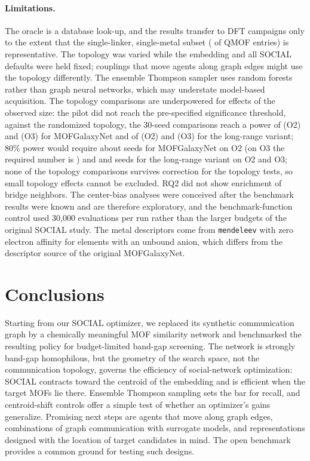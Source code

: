\documentclass[journal=jcisd8,manuscript=article]{achemso}
\begin{document}
\paragraph{Limitations.}
The oracle is a database look-up, and the results transfer to DFT campaigns only to the extent that the single-linker, single-metal subset (\nPool{} of \nQmofAll{} QMOF entries) is representative. The topology was varied while the embedding and all SOCIAL defaults were held fixed; couplings that move agents along graph edges might use the topology differently. The ensemble Thompson sampler uses random forests rather than graph neural networks, which may understate model-based acquisition. The topology comparisons are underpowered for effects of the observed size: the pilot did not reach the pre-specified significance threshold, against the randomized topology, the 30-seed comparisons reach a power of \topPowTwo{} (O2) and \topPowThree{} (O3) for MOFGalaxyNet and of \topRhoPowTwo{} (O2) and \topRhoPowThree{} (O3) for the long-range variant; 80\% power would require about \topNeightyTwo{} seeds for MOFGalaxyNet on O2 (on O3 the required number is \topNeightyThree{}) and \topRhoNeightyTwo{} and \topRhoNeightyThree{} seeds for the long-range variant on O2 and O3; none of the topology comparisons survives correction for the \nTopTests{} topology tests, so small topology effects cannot be excluded. RQ2 did not show enrichment of bridge neighbors. The center-bias analyses were conceived after the benchmark results were known and are therefore exploratory, and the benchmark-function control used 30,000 evaluations per run rather than the larger budgets of the original SOCIAL study. The metal descriptors come from \texttt{mendeleev} with zero electron affinity for elements with an unbound anion, which differs from the descriptor source of the original MOFGalaxyNet.

\section{Conclusions}
Starting from our SOCIAL optimizer, we replaced its synthetic communication graph by a chemically meaningful MOF similarity network and benchmarked the resulting policy for budget-limited band-gap screening. The network is strongly band-gap homophilous, but the geometry of the search space, not the communication topology, governs the efficiency of social-network optimization: SOCIAL contracts toward the centroid of the embedding and is efficient when the target MOFs lie there. Ensemble Thompson sampling sets the bar for recall, and centroid-shift controls offer a simple test of whether an optimizer's gains generalize. Promising next steps are agents that move along graph edges, combinations of graph communication with surrogate models, and representations designed with the location of target candidates in mind. The open benchmark provides a common ground for testing such designs.
\end{document}
